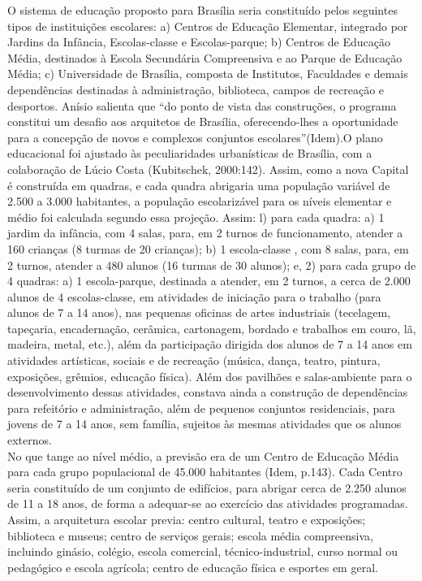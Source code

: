 O sistema de educação proposto para Brasília seria constituído pelos seguintes
tipos de instituições escolares: a) Centros de Educação Elementar, integrado por Jardins
da Infância, Escolas-classe e Escolas-parque; b) Centros de Educação Média, destinados
à Escola Secundária Compreensiva e ao Parque de Educação Média; c) Universidade de
Brasília, composta de Institutos, Faculdades e demais dependências destinadas à
administração, biblioteca, campos de recreação e desportos.
Anísio salienta que “do ponto de vista das construções, o programa constitui um desafio
aos arquitetos de Brasília, oferecendo-lhes a oportunidade para a concepção de novos e
complexos conjuntos escolares”(Idem).O plano educacional foi ajustado às
peculiaridades urbanísticas de Brasília, com a colaboração de Lúcio Costa (Kubitschek,
2000:142). Assim, como a nova Capital é construída em quadras, e cada quadra
abrigaria uma população variável de 2.500 a 3.000 habitantes, a população escolarizável
para os níveis elementar e médio foi calculada segundo essa projeção. Assim: l) para
cada quadra: a) 1 jardim da infância, com 4 salas, para, em 2 turnos de funcionamento,
atender a 160 crianças (8 turmas de 20 crianças); b) 1 escola-classe , com 8 salas, para,
em 2 turnos, atender a 480 alunos (16 turmas de 30 alunos); e, 2) para cada grupo de 4
quadras: a) 1 escola-parque, destinada a atender, em 2 turnos, a cerca de 2.000 alunos de
4 escolas-classe, em atividades de iniciação para o trabalho (para alunos de 7 a 14 anos),
nas pequenas oficinas de artes industriais (tecelagem, tapeçaria, encadernação,
cerâmica, cartonagem, bordado e trabalhos em couro, lã, madeira, metal, etc.), além da
participação dirigida dos alunos de 7 a 14 anos em atividades artísticas, sociais e de
recreação (música, dança, teatro, pintura, exposições, grêmios, educação física). Além
dos pavilhões e salas-ambiente para o desenvolvimento dessas atividades, constava
ainda a construção de dependências para refeitório e administração, além de pequenos
conjuntos residenciais, para jovens de 7 a 14 anos, sem família, sujeitos às mesmas
atividades que os alunos externos. \\

No que tange ao nível médio, a previsão era de um Centro de Educação Média
para cada grupo populacional de 45.000 habitantes (Idem, p.143). Cada Centro seria
constituído de um conjunto de edifícios, para abrigar cerca de 2.250 alunos de 11 a 18
anos, de forma a adequar-se ao exercício das atividades programadas. Assim, a
arquitetura escolar previa: centro cultural, teatro e exposições; biblioteca e museus;
centro de serviços gerais; escola média compreensiva, incluindo ginásio, colégio, escola
comercial, técnico-industrial, curso normal ou pedagógico e escola agrícola; centro de
educação física e esportes em geral.\\

